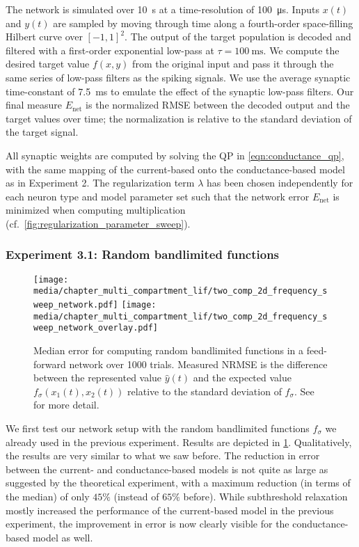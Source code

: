 The network is simulated over \SI{10}{\second} at a time-resolution of \SI{100}{\micro\second}. Inputs $x(t)$ and $y(t)$ are sampled by moving through time along a fourth-order space-filling Hilbert curve over $[-1, 1]^2$. The output of the target population is decoded and filtered with a first-order exponential low-pass at $\tau = \SI{100}{\milli\second}$. We compute the desired target value $f(x, y)$ from the original input and pass it through the same series of low-pass filters as the spiking signals. We use the average synaptic time-constant of \SI{7.5}{\milli\second} to emulate the effect of the synaptic low-pass filters. Our final measure $E_\mathrm{net}$ is the normalized RMSE between the decoded output and the target values over time; the normalization is relative to the standard deviation of the target signal.

All synaptic weights are computed by solving the QP in \cref{eqn:conductance_qp}, with the same mapping of the current-based onto the conductance-based model as in Experiment 2. The regularization term $\lambda$ has been chosen independently for each neuron type and model parameter set such that the network error $E_\mathrm{net}$ is minimized when computing multiplication (cf.~\cref{fig:regularization_parameter_sweep}).

\subsubsection*{Experiment 3.1: Random bandlimited functions}

\begin{figure}[t]
	\centering
	{\texttt{[image: media/chapter\_multi\_compartment\_lif/two\_comp\_2d\_frequency\_sweep\_network.pdf]}}%
	\kern-158.06mm\texttt{[image: media/chapter\_multi\_compartment\_lif/two\_comp\_2d\_frequency\_sweep\_network\_overlay.pdf]}
	\caption[Median error for computing random bandlimited functions in a feed-forward network over 1000 trials.]{Median error for computing random bandlimited functions in a feed-forward network over 1000 trials. Measured NRMSE is the difference between the represented value $\hat y(t)$ and the expected value $f_\sigma(x_1(t), x_2(t))$ relative to the standard deviation of $f_\sigma$. See  for more detail.}
	\label{fig:frequency_sweep_network}
\end{figure}

We first test our network setup with the random bandlimited functions $f_\sigma$ we already used in the previous experiment. Results are depicted in \cref{fig:frequency_sweep_network}. Qualitatively, the results are very similar to what we saw before. The reduction in error between the current- and conductance-based models is not quite as large as suggested by the theoretical experiment, with a maximum reduction (in terms of the median) of only $45\%$ (instead of $65\%$ before). While subthreshold relaxation mostly increased the performance of the current-based model in the previous experiment, the improvement in error is now clearly visible for the conductance-based model as well.

